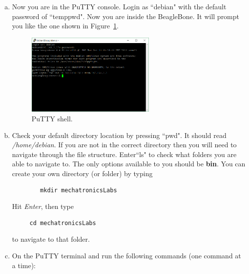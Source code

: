 \begin{enumerate}[a)]
    
    \item Now you are in the PuTTY console. Login as ``debian" with the default password of ``temppwd". Now you are inside the BeagleBone. It will prompt you like the one shown in Figure~\ref{fig:PuTTYcons}. %
%
    \begin{figure}[H]
        \centering
        \includegraphics[width= 0.6\textwidth]{figs/img/Lab0/PuTTY_Console.png}
        \caption{PuTTY shell.}
        \label{fig:PuTTYcons}
    \end{figure}
    \item  Check your default directory location by pressing ``pwd". It should read \emph{/home/debian}. If you are not in the correct directory then you will need to navigate through the file structure. Enter``ls" to check what folders you are able to navigate to. The only options available to you should be \textbf{bin}. You can create your own directory (or folder) by typing 
    \begin{verbatim}
        mkdir mechatronicsLabs
    \end{verbatim}
%    
      Hit \emph{Enter}, then type %
\begin{verbatim}
     cd mechatronicsLabs
\end{verbatim}
%
      to navigate to that folder.
    
    \item On the PuTTY terminal and run the following commands (one command at a time):
    

\end{enumerate}
